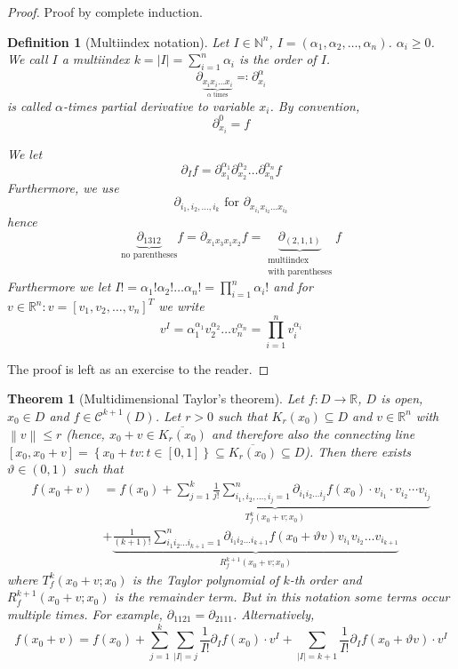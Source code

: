 \documentclass{article}
\newtheorem{theorem}{Theorem}  \numberwithin{theorem}{section}
\newtheorem{definition}{Definition}  \numberwithin{definition}{section}
\newcommand{\set}[1]{\left\{#1\right\}}
\newcommand{\norm}[1]{\left\|#1\right\|}
\newcommand{\card}[1]{\left|#1\right|}
\begin{document}
\begin{proof}
  Proof by complete induction.
  \begin{definition}[Multiindex notation] %
    Let $I \in \mathbb N^n$, $I = (\alpha_1, \alpha_2, \dots, \alpha_n)$.
    $\alpha_i \geq 0$. We call $I$ a multiindex $k = \card{I} = \sum_{i=1}^n \alpha_i$ is the \emph{order of $I$}.
    \[ \partial_{\underbrace{x_i x_i \dots x_i}_{\alpha \text{ times}}} \eqqcolon \partial_{x_i}^\alpha \]
    is called \emph{$\alpha$-times partial derivative to variable $x_i$}.
    By convention,
    \[ \partial_{x_i}^0 = f \]

    We let
    \[ \partial_I f = \partial_{x_1}^{\alpha_1} \partial_{x_2}^{\alpha_2} \dots \partial_{x_n}^{\alpha_n} f \]
    Furthermore, we use
    \[ \partial_{i_1, i_2, \dots, i_k} \text{ for } \partial_{x_{i_1} x_{i_2} \dots x_{i_k}} \]
    hence
    \[ \underbrace{\partial_{1312}}_{\text{no parentheses}} f = \partial_{x_1 x_3 x_1 x_2} f = \underbrace{\partial_{(2, 1, 1)}}_{\substack{\text{multiindex} \\ \text{with parentheses}}} f \]
    Furthermore we let $I! = \alpha_1! \alpha_2! \dots \alpha_n! = \prod_{i=1}^n \alpha_i!$
    and for $v \in \mathbb R^n: v = [v_1, v_2, \dots, v_n]^T$ we write
    \[ v^I = \alpha_1^{\alpha_1} v_2^{\alpha_2} \dots v_n^{\alpha_n} = \prod_{i=1}^n v_i^{\alpha_i} \]
  \end{definition}

  The proof is left as an exercise to the reader.
\end{proof}

\begin{theorem}[Multidimensional Taylor's theorem] %
  \label{multiTaylor}
  Let $f: D \to \mathbb R$, $D$ is open, $x_0 \in D$ and $f \in \mathcal C^{k+1}(D)$.
  Let $r > 0$ such that $K_r(x_0) \subseteq D$ and $v \in \mathbb R^n$ with $\norm{v} \leq r$
  (hence, $x_0 + v \in \overline{K_r(x_0)}$ and therefore also the connecting line
  $[x_0, x_0 + v] = \set{x_0 + tv: t \in [0, 1]} \subseteq \overline{K_r(x_0)} \subseteq D$).
  Then there exists $\vartheta \in (0,1)$ such that
  \begin{align*}
    f(x_0 + v) &= \underbrace{f(x_0) + \sum_{j=1}^k \frac1{j!} \sum_{i_1, i_2, \dots, i_j=1}^{n} \partial_{i_1 i_2 \dots i_j} f(x_0) \cdot v_{i_1} \cdot v_{i_2} \cdots v_{i_j}}_{T_f^k(x_0 + v; x_0)} \\
      &+ \underbrace{\frac{1}{(k+1)!} \sum_{i_1 i_2 \dots i_{k+1} = 1}^n \partial_{i_1 i_2 \dots i_{k+1}} f(x_0 + \vartheta v) v_{i_1} v_{i_2} \dots v_{i_{k+1}}}_{R_f^{k+1}(x_0 + v; x_0)}
  \end{align*}
  where $T_f^k(x_0 + v; x_0)$ is the Taylor polynomial of $k$-th order and $R_f^{k+1}(x_0 + v; x_0)$ is the remainder term.
  But in this notation some terms occur multiple times. For example, $\partial_{1121} = \partial_{2111}$. Alternatively,
  \[ f(x_0 + v) = f(x_0) + \sum_{j=1}^k \sum_{\card{I} = j} \frac{1}{I!} \partial_I f(x_0) \cdot v^I + \sum_{\card{I} = k+1} \frac{1}{I!} \partial_I f(x_0 + \vartheta v) \cdot v^I  \]
\end{theorem}
\end{document}
